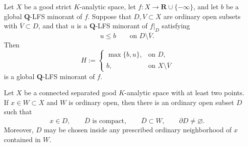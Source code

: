 
\begin{lemma}
\label{lem:p031-rational-protected-collar-gluing}
Let $X$ be a good strict $K$-analytic space, let
$f:X\to\mathbf R\cup\{-\infty\}$, and let $b$ be a global
$\mathbf Q$-LFS minorant of $f$.  Suppose that $D,V\subset X$ are
ordinary open subsets with $\overline V\subset D$, and that $u$ is a
$\mathbf Q$-LFS minorant of $f|_D$ satisfying
\begin{equation}
\label{eq:p031-rational-protected-collar-order}
                         u\leq b
                 \qquad\text{on }D\setminus\overline V.
\end{equation}
Then
\begin{equation}
\label{eq:p031-rational-protected-collar-gluing}
 H:=
 \begin{cases}
    \max\{b,u\},&\text{on }D,\\
    b,&\text{on }X\setminus\overline V
 \end{cases}
\end{equation}
is a global $\mathbf Q$-LFS minorant of $f$.
\end{lemma}

\begin{lemma}
\label{lem:p031-small-nonempty-boundary-domain}
Let $X$ be a connected separated good $K$-analytic space with at least two
points.  If $x\in W\subset X$ and $W$ is ordinary open, then there is an
ordinary open subset $D$ such that
\begin{equation}
\label{eq:p031-small-nonempty-boundary-domain}
 x\in D,\qquad \overline D\text{ is compact},\qquad
 \overline D\subset W,\qquad \partial D\ne\varnothing.
\end{equation}
Moreover, $D$ may be chosen inside any prescribed ordinary neighborhood
of $x$ contained in $W$.
\end{lemma}

